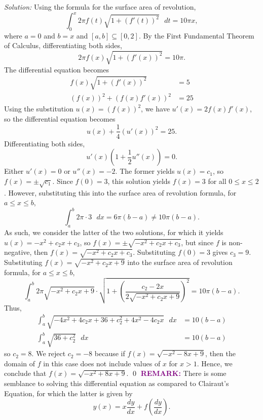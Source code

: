 \documentclass{article}
\begin{document}
\newline\textit{Solution:} Using the formula for the surface area of revolution, \[\int_{0}^{x}{2\pi f\left( t \right)\sqrt{1+{{\left( f'\left( t \right) \right)}^{2}}}\text{ }dt}=10\pi x,\] where $a=0$ and $b=x$ and $[a,b]\subseteq [0,2]$. By the First Fundamental Theorem of Calculus, differentiating both sides, \[2\pi f(x)\sqrt{1+(f'(x))^2}=10\pi.\] The differential equation becomes \begin{align*}
  f(x)\sqrt{1+{{({f}'(x))}^{2}}}&=5 \\ 
  {{\left( f(x) \right)}^{2}}+{{\left( f(x){f}'(x) \right)}^{2}}&=25  
\end{align*} Using the substitution $u(x)=(f(x))^2$, we have $u'(x)=2f(x)f'(x)$, so the differential equation becomes \[u(x)+\frac{1}{4}(u'(x))^2=25.\] Differentiating both sides, \[u'(x)\left(1+\frac{1}{2}u''(x)\right)=0.\] Either $u'(x)=0$ or $u''(x)=-2$. The former yields $u(x)=c_1$, so $f(x)=\pm\sqrt{c_1}$. Since $f(0)=3$, this solution yields $f(x)=3$ for all $0 \le x \le 2$. However, substituting this into the surface area of revolution formula, for $a \le x \le b$, \[\int_{a}^{b} 2\pi \cdot 3\text{ }dx =6\pi (b-a) \ne 10\pi (b-a).\] As such, we consider the latter of the two solutions, for which it yields $u(x)=-x^2+c_2x+c_3$, so $f(x)=\pm\sqrt{-x^2+c_2x+c_3}$, but since $f$ is non-negative, then $f(x)=\sqrt{-x^2+c_2x+c_3}$. Substituting $f(0)=3$ gives $c_3=9$. Substituting $f(x)=\sqrt{-x^2+c_2x+9}$ into the surface area of revolution formula, for $a \le x \le b$, \[\int_{a}^{b} 2\pi \sqrt{-x^2+c_2x+9}\cdot \sqrt{1+\left(\dfrac{c_2-2x}{2\sqrt{-x^2+c_2x+9}} \right )^2}=10\pi(b-a).\] Thus, \begin{align*}
    \int_{a}^{b}\sqrt{-4x^2+4c_2x+36+c_2^2+4x^2-4c_2x}\text{ }dx&=10(b-a)\\
    \int_{a}^{b}\sqrt{36+c_2^2}\text{ }dx&=10(b-a)
\end{align*}
so $c_2=8$. We reject $c_2=-8$ because if $f(x)=\sqrt{-x^2-8x+9}$, then the domain of $f$ in this case does not include values of $x$ for $x>1$. Hence, we conclude that $f(x)=\sqrt{-x^2+8x+9}$. \qed
\newline
\newline \textbf{\textcolor{purple}{REMARK:}} There is some semblance to solving this differential equation as compared to Clairaut's Equation, for which the latter is given by \[y(x)=x\frac{dy}{dx}+f\left(\frac{dy}{dx}\right).\]
\newpage
\end{document}
